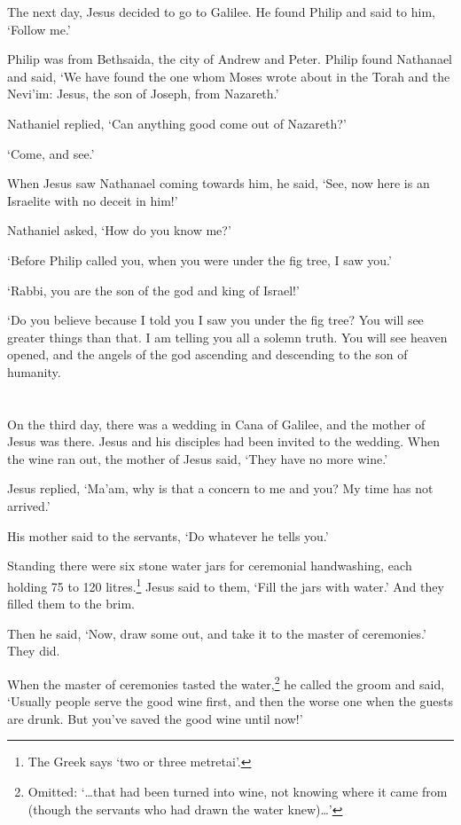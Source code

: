 The next day, 
Jesus decided to go to Galilee.
He found Philip and said to him,
`Follow me.'

Philip was from Bethsaida,
the city of Andrew and Peter.
Philip found Nathanael and said, 
`We have found the one whom 
Moses wrote about in the Torah and the Nevi'im: 
Jesus, the son of Joseph, from Nazareth.'

Nathaniel replied, `Can anything good come out of Nazareth?'

`Come, and see.'

When Jesus saw Nathanael coming towards him, he said,
`See, now here is an Israelite with no deceit in him!'

Nathaniel asked, `How do you know me?'

`Before Philip called you, when you were under the fig tree,
I saw you.'

`Rabbi, you are the son of the god and king of Israel!'

`Do you believe because I told you I saw you under the fig tree?
You will see greater things than that.
I am telling you all a solemn truth.
You will see heaven opened, 
and the angels of the god ascending and descending 
to the son of humanity.



\section{}
On the third day, there was a wedding in Cana of Galilee,
and the mother of Jesus was there.
Jesus and his disciples had been invited to the wedding.
When the wine ran out,
the mother of Jesus said,
`They have no more wine.'

Jesus replied, 
`Ma'am, why is that a concern to me and you?
My time has not arrived.'

His mother said to the servants, 
`Do whatever he tells you.'

Standing there were six stone water jars
for ceremonial handwashing,
each holding 75 to 120 litres.\footnote{The Greek says `two or three metretai'.}
Jesus said to them, `Fill the jars with water.'
And they filled them to the brim.

Then he said, `Now, draw some out, and take it to the master of ceremonies.'
They did. 

When the master of ceremonies tasted the water,\footnote{Omitted:
    `\dots that had been turned into wine, not knowing where it came from
    (though the servants who had drawn the water knew)\dots'
} he called the groom and said,
`Usually people serve the good wine first,
and then the worse one
when the guests are drunk.
But you've saved the good wine until now!'

